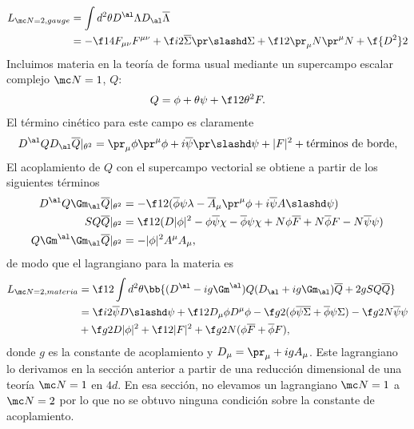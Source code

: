 \begin{align}
	L_{\mc N=2,gauge} &= \int d^2\theta D^\al\Lambda D_\al\overline\Lambda\nonumber\\
	&=-\f 14 F_{\mu\nu}F^{\mu\nu}+\f i2\overline\Sigma\pr\slashd\Sigma+\f 12\pr_\mu N\pr^\mu N+\f{D^2}2
\end{align}
Incluimos materia en la teoría de forma usual mediante un supercampo escalar complejo $\mc N=1$, $Q$:
\begin{align}
	Q = \phi+\theta\psi+\f 12\theta^2 F.
\end{align}
El término cinético para este campo es claramente
\begin{align}
	D^\al QD_\al\overline Q\vert_{\theta^2} = \pr_\mu\phi\pr^\mu\phi+i\overline\psi\pr\slashd\psi+|F|^2+\text{términos de borde},
\end{align}
El acoplamiento de $Q$ con el supercampo vectorial se obtiene a partir de los siguientes términos
\begin{align}
	D^\al Q\Gm_\al\overline Q\vert_{\theta^2} &= -\f 12(\overline\phi\psi\lambda-\overline A_\mu\pr^\mu\phi+i\overline\psi A\slashd\psi)\\
	SQ\overline Q\vert_{\theta^2} &= \f 12(D|\phi|^2-\phi\overline\psi\chi-\overline\phi\psi\chi+N\phi\overline F+N\overline\phi F-N\overline\psi\psi)\\
	Q\Gm^\al\Gm_\al\overline Q\vert_{\theta^2} &= -|\phi|^2A^\mu A_\mu,
\end{align}
de modo que el lagrangiano para la materia es
\begin{align}
	L_{\mc N=2,materia} &= \f 12\int d^2\theta\bb{(D^\al-ig\Gm^\al)Q(D_\al+ig\Gm_\al)\overline Q+2gSQ\overline Q}\nonumber\\
	&= \f i2\overline\psi D\slashd\psi+\f 12 D_\mu\phi D^\mu\phi-\f g2(\phi\overline{\psi\Sigma}+\overline\phi\psi\Sigma)-\f g2N\overline\psi\psi\nonumber\\
	&+\f g2 D|\phi|^2+\f 12|F|^2+\f g2N(\phi\overline F+\overline\phi F), \label{eq:5.2.2.10}
\end{align}
donde $g$ es la constante de acoplamiento y $D_\mu=\pr_\mu+ig A_\mu$. Este lagrangiano lo derivamos en la sección anterior a partir de una reducción dimensional de una teoría $\mc N=1$ en $4d$. En esa sección, no elevamos un lagrangiano $\mc N=1$ a $\mc N=2$ por lo que no se obtuvo ninguna condición sobre la constante de acoplamiento.

